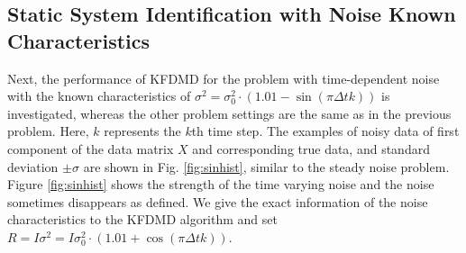 \documentclass[aip,graphicx]{revtex4-1}
\begin{document}
\subsection{Static System Identification with Noise Known Characteristics}
\label{sec:RESSWN}
Next, the performance of KFDMD for the problem with time-dependent noise with the known characteristics of  $\sigma^2 = \sigma_0^2 \cdot \left( 1.01 - \sin \left( \pi \Delta t k\right)\right)$ is investigated, whereas the other problem settings are the same as in the previous problem. Here, $k$ represents the $k$th time step. The examples of noisy data of first component of the data matrix $X$ and corresponding true data, and standard deviation $\pm \sigma$ are shown in Fig. \ref{fig:sinhist}, similar to the steady noise problem.  Figure \ref{fig:sinhist} shows the strength of the time varying noise and the noise sometimes disappears as defined.   We give the exact information of the noise characteristics to the KFDMD algorithm and set $R=I\sigma^2 = I\sigma_0^2 \cdot \left( 1.01 + \cos\left( \pi \Delta t k\right)\right)$. 
\end{document}
